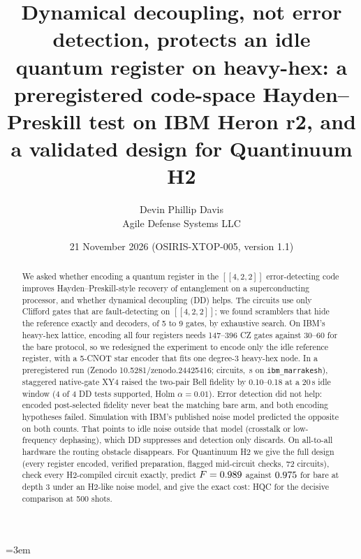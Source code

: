 \documentclass[10pt,twocolumn]{article}
\title{\bfseries Dynamical decoupling, not error detection, protects an idle quantum register on heavy-hex:
a preregistered code-space Hayden--Preskill test on IBM Heron r2, and a validated design for Quantinuum H2}
\author{Devin Phillip Davis\\ \small Agile Defense Systems LLC}
\date{21 November 2026 \quad (OSIRIS-XTOP-005, version 1.1)}
\begin{document}
\emergencystretch=3em
\maketitle

\begin{abstract}
\noindent
We asked whether encoding a quantum register in the $[[4,2,2]]$ error-detecting code improves
Hayden--Preskill-style recovery of entanglement on a superconducting processor, and whether
dynamical decoupling (DD) helps. The circuits use only Clifford gates that are fault-detecting on
$[[4,2,2]]$; we found scramblers that hide the reference exactly and decoders, of 5 to 9 gates, by
exhaustive search. On IBM's heavy-hex lattice, encoding all four registers needs 147--396 CZ gates
against 30--60 for the bare protocol, so we redesigned the experiment to encode only the idle reference
register, with a 5-CNOT star encoder that fits one degree-3 heavy-hex node. In a preregistered run
(Zenodo 10.5281/zenodo.24425416; \NCirc{} circuits, \QPUs\,s on \texttt{ibm\_marrakesh}), staggered
native-gate XY4 raised the two-pair Bell fidelity by 0.10--0.18 at a 20\,\textmu s idle window (4 of 4
DD tests supported, Holm $\alpha=0.01$). Error detection did not help: encoded post-selected fidelity
never beat the matching bare arm, and both encoding hypotheses failed. Simulation with IBM's published
noise model predicted the opposite on both counts. That points to idle noise outside that model
(crosstalk or low-frequency dephasing), which DD suppresses and detection only discards. On
all-to-all hardware the routing obstacle disappears. For Quantinuum H2 we give the full design (every
register encoded, verified preparation, flagged mid-circuit checks, 72 circuits), check every
H2-compiled circuit exactly, predict $F=0.989$ against $0.975$ for bare at depth 3 under an
H2-like noise model, and give the exact cost: \HQCminB{} HQC for the decisive comparison at 500 shots.
\end{abstract}
\end{document}
